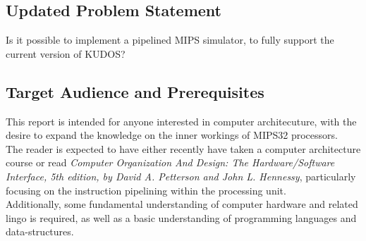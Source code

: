 \subsection*{Updated Problem Statement}
Is it possible to implement a pipelined MIPS simulator, to fully support the
current version of KUDOS?

\subsection*{Target Audience and Prerequisites}
This report is intended for anyone interested in computer architecuture, with
the desire to expand the knowledge on the inner workings of MIPS32 processors.\\
The reader is expected to have either recently have taken a computer architecture course
or read \textit{Computer Organization And Design: The Hardware/Software Interface, 5th
edition, by David A. Petterson and John L. Hennessy}, particularly focusing on
the instruction pipelining within the processing unit.\\
Additionally, some fundamental understanding of computer hardware and related lingo is required,
as well as a basic understanding of programming languages and data-structures.
